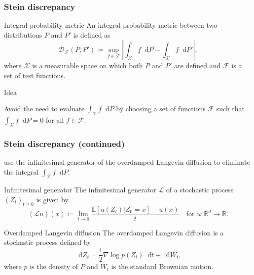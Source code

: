 \documentclass{beamer}
\newcommand*\diff{\mathop{}\!\mathrm{d}}
\begin{document}
\begin{frame}
\frametitle{Stein discrepancy}

\begin{block}{Integral probability metric}
An integral probability metric between two distributions $P$ and $P'$ is defined as
\begin{equation*}
\mathcal{D}_{\mathcal{F}}(P, P') \coloneq \sup_{f \in \mathcal{F}}\left|\int_\mathcal{X} f \diff P - \int_\mathcal{X} f \diff P' \right|,
\end{equation*}
where $\mathcal{X}$ is a measurable space on which both $P$ and $P'$ are defined and $\mathcal{F}$ is a set of test functions.
\end{block}

\begin{block}{Idea}

Avoid the need to evaluate $\int_\mathcal{X} f \diff P$ by choosing a set of functions $\mathcal{F}$ such that $\int_\mathcal{X} f \diff P = 0$ for all $f \in \mathcal{F}$.

\end{block}

\end{frame}



\begin{frame}
\frametitle{Stein discrepancy (continued)}

\cite{gorhamMeasuringSampleQuality2015} use the infinitesimal generator of the overdamped Langevin diffusion to eliminate the integral $\int_\mathcal{X} f \diff P$.

\begin{block}{Infinitesimal generator}
The infinitesimal generator $\mathcal{L}$ of a stochastic process $(Z_t)_{t \geq 0}$ is given by
\begin{equation*}
(\mathcal{L}u)(x) \coloneq \lim_{t \to 0} \frac{\mathbb{E}[u(Z_t) | Z_0 = x] - u(x)}{t} \quad \text{for } u:\mathbb{R}^d \to \mathbb{R}.
\end{equation*}
\end{block}

\begin{block}{Overdamped Langevin diffusion}
The overdamped Langevin diffusion is a stochastic process defined by
\begin{equation*}
\diff Z_t = \frac{1}{2} \nabla \log p(Z_t) \diff t + \diff W_t,
\end{equation*}
where $p$ is the density of $P$ and $W_t$ is the standard Brownian motion.
\end{block}

\end{frame}
\end{document}
